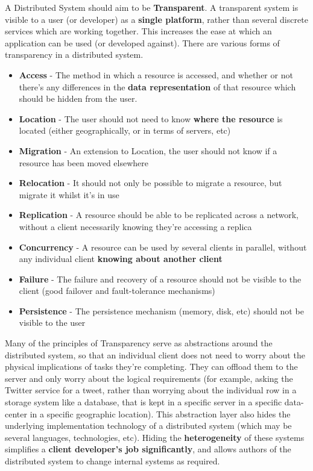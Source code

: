 \documentclass{article}
\begin{document}
A Distributed System should aim to be \textbf{Transparent}. A transparent system is visible to a user (or developer) as a \textbf{single platform}, rather than several discrete services which are working together. This increases the ease at which an application can be used (or developed against). There are various forms of transparency in a distributed system.
\begin{itemize}
    \item \textbf{Access} - The method in which a resource is accessed, and whether or not there's any differences in the \textbf{data representation} of that resource which should be hidden from the user.
    \item \textbf{Location} - The user should not need to know \textbf{where the resource} is located (either geographically, or in terms of servers, etc)
    \item \textbf{Migration} - An extension to Location, the user should not know if a resource has been moved elsewhere
    \item \textbf{Relocation} - It should not only be possible to migrate a resource, but migrate it whilst it's in use
    \item \textbf{Replication} - A resource should be able to be replicated across a network, without a client necessarily knowing they're accessing a replica
    \item \textbf{Concurrency} - A resource can be used by several clients in parallel, without any individual client \textbf{knowing about another client}
    \item \textbf{Failure} - The failure and recovery of a resource should not be visible to the client (good failover and fault-tolerance mechanisms)
    \item \textbf{Persistence} - The persistence mechanism (memory, disk, etc) should not be visible to the user
\end{itemize}

Many of the principles of Transparency serve as abstractions around the distributed system, so that an individual client does not need to worry about the physical implications of tasks they're completing. They can offload them to the server and only worry about the logical requirements (for example, asking the Twitter service for a tweet, rather than worrying about the individual row in a storage system like a database, that is kept in a specific server in a specific data-center in a specific geographic location). This abstraction layer also hides the underlying implementation technology of a distributed system (which may be several languages, technologies, etc). Hiding the \textbf{heterogeneity} of these systems simplifies a \textbf{client developer's job significantly}, and allows authors of the distributed system to change internal systems as required. 
\end{document}
